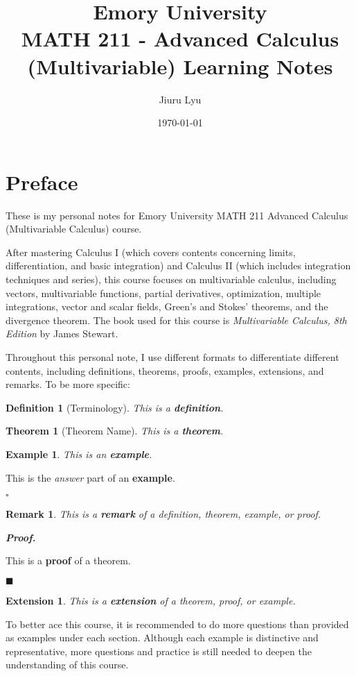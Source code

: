 \documentclass[12pt,a4paper]{article}
\title{Emory University\\\textbf{MATH 211 - Advanced Calculus (Multivariable) Learning Notes}}
\author{Jiuru Lyu}
\date{\today}
\newtheorem{thm}{Theorem}[subsection]
\newtheorem{df}{Definition}[subsection]
\newtheorem{eg}{Example}[subsection]
\newenvironment*{ans}{\par\indent{\textit{Answer. }}\par}{\par\hfill{$\square$}\par}
\newtheorem*{rmk}{\indent Remark}
\newenvironment*{prf}{\par\indent\textbf{\textit{Proof. }}\par}{\par\hfill$\blacksquare$\par}
\newtheorem*{ext}{\indent Extension}
\begin{document}
\maketitle
\tableofcontents
\newpage

\section*{Preface}
These is my personal notes for Emory University MATH 211 Advanced Calculus (Multivariable Calculus) course. 

After mastering Calculus I (which covers contents concerning limits, differentiation, and basic integration) and Calculus II (which includes integration techniques and series), this course focuses on multivariable calculus, including vectors, multivariable functions, partial derivatives, optimization, multiple integrations, vector and scalar fields, Green’s and Stokes’ theorems, and the divergence theorem. The book used for this course is \textit{Multivariable Calculus, 8th Edition} by James Stewart. 

Throughout this personal note, I use different formats to differentiate different contents, including definitions, theorems, proofs, examples, extensions, and remarks. To be more specific: 
\begin{df}[Terminology]
    This is a \textbf{definition}.	
\end{df}
\begin{thm}[Theorem Name]
    This is a \textbf{theorem}.	
\end{thm}
\begin{eg}
    This is  an \textbf{example}. 
\end{eg}

\begin{ans}
    This is the \textit{answer} part of an \textbf{example}. 
\end{ans}
\begin{rmk}
	This is a \textbf{remark} of a definition, theorem, example, or proof. 
\end{rmk}

\begin{prf}
	This is a \textbf{proof} of a theorem. 
\end{prf}
\begin{ext}
	This is a \textbf{extension} of a theorem, proof, or example. 	
\end{ext}
To better ace this course, it is recommended to do more questions than provided as examples under each section. Although each example is distinctive and representative, more questions and practice is still needed to deepen the understanding of this course. 
\end{document}
